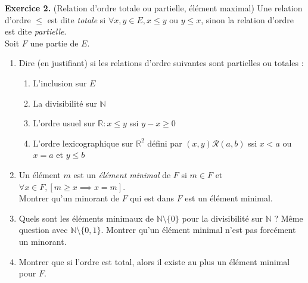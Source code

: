 \documentclass[a4paper, 10pt]{report}
\begin{document}
	\newpage
	
	\fancyhf{}
	\renewcommand{\headrule}
	{\rule{\textwidth}{0pt}}
	
	\vspace{5mm}
	\noindent
	\textbf{Exercice 2.} (Relation d'ordre totale ou partielle, élément
	maximal) Une relation d'ordre $\leq$ est dite \textit{totale} si 
	$\forall x, y \in E, x \leq y$ ou $y \leq x$, sinon la relation
	d'ordre est dite \textit{partielle}.\\
	Soit $F$ une partie de $E$.
	\begin{enumerate}[label=\arabic*.]
		\item Dire (en justifiant) si les relations d'ordre suivantes sont
		partielles ou totales :
		\begin{enumerate}[label=(\alph*)]
			\item L'inclusion sur $E$
			\item La divisibilité sur $\mathbb{N}$
			\item L'ordre usuel sur $\mathbb{R} : x \leq y$ ssi $y-x \geq 0$
			\item L'ordre lexicographique sur $\mathbb{R}^2$ défini par
			$(x, y)\mathcal{R}(a, b)$ ssi $x < a$ ou $x = a$ et $ y \leq b$
		\end{enumerate}
		\item Un élément $m$ est un \textit{élément minimal} de $F$ si
		$m \in F$ et $\forall x \in F, [m \geq x \implies x = m]$.\\
		Montrer qu'un minorant de $F$ qui est dans $F$ est un élément
		minimal.
		\item Quels sont les éléments minimaux de
		$\mathbb{N} \setminus \{0\}$ pour la divisibilité sur $\mathbb{N}$ ?
		Même question avec $\mathbb{N} \setminus \{0, 1\}$. Montrer qu'un
		élément minimal n'est pas forcément un minorant.
		\item Montrer que si l'ordre est total, alors il existe au plus un
		élément minimal pour $F$.
	\end{enumerate}
	
\end{document}
